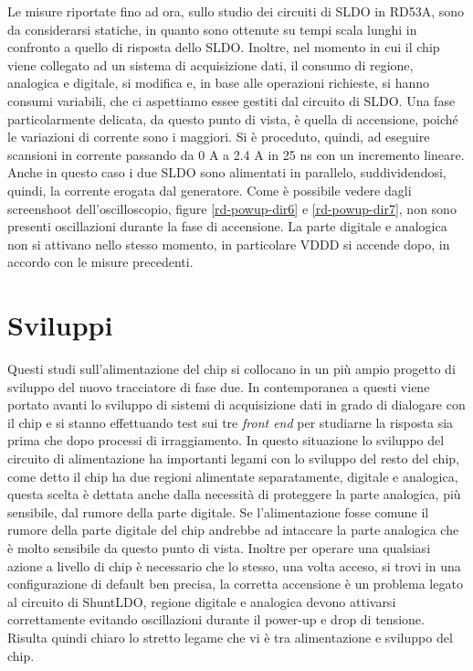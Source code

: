 Le misure riportate fino ad ora, sullo studio dei circuiti di SLDO in RD53A, sono da considerarsi statiche, in quanto sono ottenute su tempi scala lunghi in confronto a quello di risposta dello SLDO. 
Inoltre, nel momento in cui il chip viene collegato ad un sistema di acquisizione dati, il consumo di regione, analogica e digitale, si modifica e, in base alle operazioni richieste, si hanno consumi variabili, che ci aspettiamo essee gestiti dal circuito di SLDO. 
Una fase particolarmente delicata, da questo punto di vista, è quella di accensione, poiché le variazioni di corrente sono i maggiori. 
Si è proceduto, quindi, ad eseguire scansioni in corrente passando da 0 A a 2.4 A in 25 ns con un incremento lineare. 
Anche in questo caso i due SLDO sono alimentati in parallelo, suddividendosi, quindi, la corrente erogata dal generatore. 
Come è possibile vedere dagli screenshoot dell'oscilloscopio, figure \ref{rd-powup-dir6} e \ref{rd-powup-dir7}, non sono presenti oscillazioni durante la fase di accensione.
La parte digitale e analogica non si attivano nello stesso momento, in particolare VDDD si accende dopo, in accordo con le misure precedenti.

\section{Sviluppi}

Questi studi sull'alimentazione del chip si collocano in un più ampio progetto di sviluppo del nuovo tracciatore di fase due. In contemporanea a questi viene portato avanti lo sviluppo di sistemi di acquisizione dati in grado di dialogare con il chip e si stanno effettuando test sui tre \textit{front end} per studiarne la risposta sia prima che dopo processi di irraggiamento. 
In questo situazione lo sviluppo del circuito di alimentazione ha importanti legami con lo sviluppo del resto del chip, come detto il chip ha due regioni alimentate separatamente, digitale e analogica, questa scelta è dettata anche dalla necessità di proteggere la parte analogica, più sensibile, dal rumore della parte digitale. Se l'alimentazione fosse comune il rumore della parte digitale del chip andrebbe ad intaccare la parte analogica che è molto sensibile da questo punto di vista. 
Inoltre per operare una qualsiasi azione a livello di chip è necessario che lo stesso, una volta acceso, si trovi in una configurazione di default ben precisa, la corretta accensione è un problema legato al circuito di ShuntLDO, regione digitale e analogica devono attivarsi correttamente evitando oscillazioni durante il power-up e drop di tensione. 
Risulta quindi chiaro lo stretto legame che vi è tra alimentazione e sviluppo del chip. 

